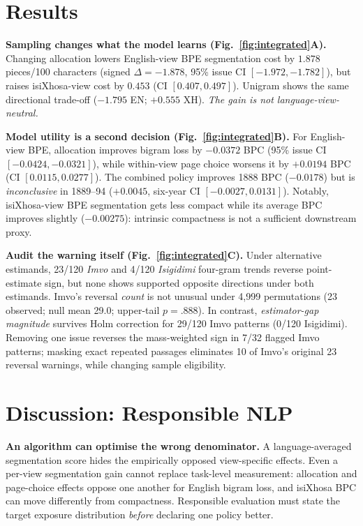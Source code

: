 \documentclass[10pt,letterpaper]{article}
\begin{document}
\section{Results}
\textbf{Sampling changes what the model learns (Fig.~\ref{fig:integrated}A).} Changing allocation lowers English-view BPE segmentation cost by $1.878$ pieces/100 characters (signed $\Delta=-1.878$, 95\% issue CI $[-1.972,-1.782]$), but raises isiXhosa-view cost by $0.453$ (CI $[0.407,0.497]$). Unigram shows the same directional trade-off ($-1.795$ EN; $+0.555$ XH). \emph{The gain is not language-view-neutral.}

\textbf{Model utility is a second decision (Fig.~\ref{fig:integrated}B).} For English-view BPE, allocation improves bigram loss by $-0.0372$ BPC (95\% issue CI $[-0.0424,-0.0321]$), while within-view page choice worsens it by $+0.0194$ BPC (CI $[0.0115,0.0277]$). The combined policy improves 1888 BPC ($-0.0178$) but is \emph{inconclusive} in 1889--94 ($+0.0045$, six-year CI $[-0.0027,0.0131]$). Notably, isiXhosa-view BPE segmentation gets less compact while its average BPC improves slightly ($-0.00275$): intrinsic compactness is not a sufficient downstream proxy.

\textbf{Audit the warning itself (Fig.~\ref{fig:integrated}C).} Under alternative estimands, 23/120 \emph{Imvo} and 4/120 \emph{Isigidimi} four-gram trends reverse point-estimate sign, but none shows supported opposite directions under both estimands. Imvo's reversal \emph{count} is not unusual under 4,999 permutations (23 observed; null mean 29.0; upper-tail $p=.888$). In contrast, \emph{estimator-gap magnitude} survives Holm correction for 29/120 Imvo patterns (0/120 Isigidimi). Removing one issue reverses the mass-weighted sign in 7/32 flagged Imvo patterns; masking exact repeated passages eliminates 10 of Imvo's original 23 reversal warnings, while changing sample eligibility.

\section{Discussion: Responsible NLP}
\textbf{An algorithm can optimise the wrong denominator.} A language-averaged segmentation score hides the empirically opposed view-specific effects. Even a per-view segmentation gain cannot replace task-level measurement: allocation and page-choice effects oppose one another for English bigram loss, and isiXhosa BPC can move differently from compactness. Responsible evaluation must state the target exposure distribution \emph{before} declaring one policy better.
\end{document}
